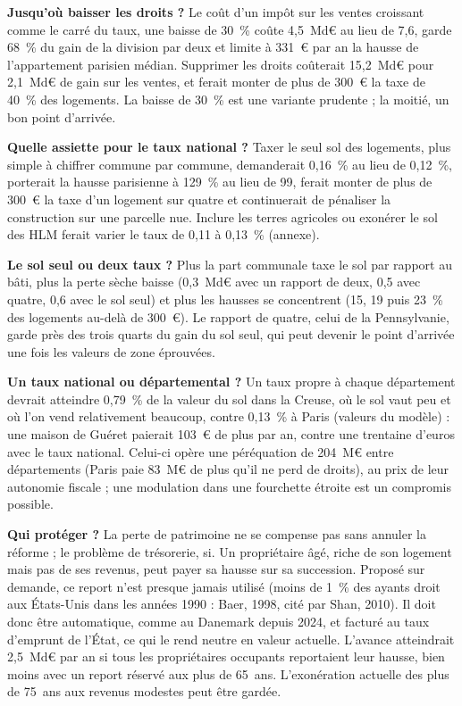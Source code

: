 \documentclass[11pt,a4paper]{article}
\begin{document}
\textbf{Jusqu'où baisser les droits ?} Le coût d'un impôt sur les ventes croissant comme le carré du taux, une baisse
de 30~\% coûte 4,5~Md€ au lieu de 7,6, garde 68~\% du gain de la
division par deux et limite à 331~€ par an la hausse de l'appartement parisien médian. Supprimer les droits coûterait
15,2~Md€ pour 2,1~Md€ de gain sur les ventes, et ferait monter de plus de 300~€ la taxe de 40~\% des logements. La baisse
de 30~\% est une variante prudente ; la moitié, un bon point d'arrivée.

\textbf{Quelle assiette pour le taux national ?} Taxer le seul sol des logements, plus simple à chiffrer commune par
commune, demanderait 0,16~\% au lieu de 0,12~\%, porterait la hausse parisienne à 129~\% au lieu de 99, ferait monter de
plus de 300~€ la taxe d'un logement sur quatre et continuerait de pénaliser la construction sur une parcelle nue.
Inclure les terres agricoles ou exonérer le sol des HLM ferait varier le taux de 0,11 à 0,13~\% (annexe).

\textbf{Le sol seul ou deux taux ?} Plus la part communale taxe le sol par rapport au bâti, plus la perte sèche baisse
(0,3~Md€ avec un rapport de deux, 0,5 avec quatre, 0,6 avec le sol seul) et plus les hausses se concentrent (15, 19 puis
23~\% des logements au-delà de 300~€). Le rapport de quatre, celui de la Pennsylvanie, garde près des trois quarts du gain
du sol seul, qui peut devenir le point d'arrivée une fois les valeurs de zone éprouvées.

\textbf{Un taux national ou départemental ?} Un taux propre à chaque département devrait atteindre 0,79~\% de la valeur
du sol dans la Creuse, où le sol vaut peu et où l'on vend relativement beaucoup, contre 0,13~\% à Paris (valeurs du
modèle) : une maison de Guéret paierait 103~€ de plus par an, contre une trentaine d'euros avec le taux national. Celui-ci
opère une péréquation de 204~M€ entre départements (Paris paie 83~M€ de plus qu'il ne perd de droits), au prix de leur
autonomie fiscale ; une modulation dans une fourchette étroite est un compromis possible.

\textbf{Qui protéger ?} La perte de patrimoine ne se compense pas sans annuler la réforme ; le problème de trésorerie,
si. Un propriétaire âgé, riche de son logement mais pas de ses revenus, peut payer sa hausse sur sa succession. Proposé
sur demande, ce report n'est presque jamais utilisé (moins de 1~\% des ayants droit aux États-Unis dans les années 1990 :
Baer, 1998, cité par Shan, 2010). Il doit donc être automatique, comme au Danemark depuis 2024, et facturé au taux
d'emprunt de l'État, ce qui le rend neutre en valeur actuelle. L'avance atteindrait 2,5~Md€ par an si tous les propriétaires occupants reportaient
leur hausse, bien moins avec un report réservé aux plus de 65~ans. L'exonération actuelle des plus de 75~ans aux revenus modestes peut être gardée.
\end{document}
